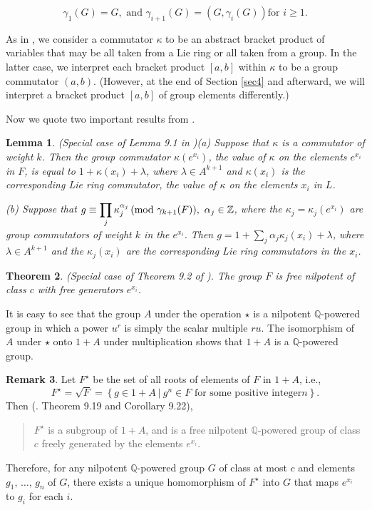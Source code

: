 \documentclass[mathscr]{amsart}
\theoremstyle{theorem}
\newtheorem{theorem}{Theorem}[section]
\newtheorem{lemma}[theorem]{Lemma}
\theoremstyle{definition}
\newtheorem{remark}[theorem]{Remark}
\numberwithin{equation}{section}
\newcommand{\smod}[1]{\hspace*{-.1cm}\pmod{#1}}
\def \({\left(}
\def \){\right)}
\begin{document}
$$\gamma_1(G)=G,\text{ and }\gamma_{i+1}(G)=\(G,\gamma_i(G)\)\text{
for }i\geq 1.$$

As in \cite{Kh}, we consider a commutator $\kappa$ to be an abstract
bracket product of variables that may be all taken from a Lie ring
or all taken from a group.  In the latter case, we interpret each
bracket product $[a,b]$ within $\kappa$ to be a group commutator
$(a,b)$. (However, at the end of Section \ref{sec4} and afterward,
we will interpret a bracket product $[a,b]$ of group elements
differently.)

Now we quote two important results from \cite{Kh}.

\begin{lemma} (Special case of Lemma 9.1 in \cite{Kh})\label{lemma3.1}
(a) Suppose that $\kappa$ is a commutator of weight $k$.  Then the
group commutator $\kappa\(e^{x_i}\)$, the value of $\kappa$ on the
elements $e^{x_i}$ in $F$, is equal to $1+\kappa\(x_i\)+\lambda$,
where $\lambda\in A^{k+1}$ and $\kappa\(x_i\)$ is the corresponding
Lie ring commutator, the value of $\kappa$ on the elements $x_i$ in
$L$.

(b) Suppose that $\displaystyle g\equiv \prod_j
\kappa_j^{\alpha_j}\smod{\gamma_{k+1}(F)},~ \alpha_j\in \mathbb{Z}$,
where the $\kappa_j=\kappa_j\(e^{x_i}\)$ are group commutators of
weight $k$ in the $e^{x_i}$.  Then $\displaystyle g=1+\sum_j
\alpha_j\kappa_j\(x_i\)+\lambda$, where $\lambda \in A^{k+1}$ and
the $\kappa_j\(x_i\)$ are the corresponding Lie ring commutators in
the $x_i$.
\end{lemma}

\begin{theorem}(Special case of Theorem 9.2 of \cite{Kh}).  The
group $F$ is free nilpotent of class $c$ with free generators
$e^{x_i}$.  \label{theo3.2}
\end{theorem}

It is easy to see that the group $A$ under the operation $\star$ is
a nilpotent $\mathbb{Q}$-powered group in which a power $u^r$ is
simply the scalar multiple $ru$. The isomorphism of $A$ under
$\star$ onto $1+A$ under multiplication shows that $1+A$ is a
$\mathbb{Q}$-powered group.

\begin{remark}\label{rem3.3}  Let $F^\star$ be the set of all roots
of elements of $F$ in $1+A$, i.e.,
$$F^{\star}=\sqrt{F}=\left\{g\in 1+A\ |\ g^n\in F\text{ for some positive integer
}n\right\}.$$
 Then (\cite{Kh}.  Theorem 9.19 and Corollary 9.22),

\begin{quote}
$F^\star$ is a subgroup of $1+A$, and is a free nilpotent
$\mathbb{Q}$-powered group of class $c$ freely generated by the
elements $e^{x_i}$.
\end{quote}
Therefore, for any nilpotent $\mathbb{Q}$-powered group $G$ of class
at most $c$ and elements $g_1,\,\dots,\,g_n$ of $G$, there exists a
unique homomorphism of $F^\star$ into $G$ that maps $e^{x_i}$ to
$g_i$ for each $i$.
\end{remark}
\end{document}

